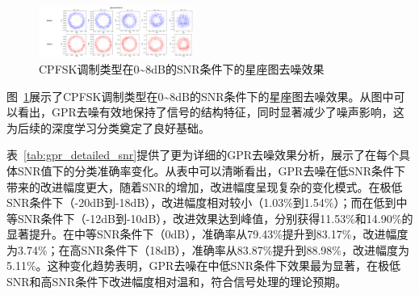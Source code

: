 \documentclass[conference]{IEEEtran}
\begin{document}
\begin{figure}[htbp]
\centering
\includegraphics[width=0.45\textwidth]{figure/constellation_denoising.png}
\caption{CPFSK调制类型在0\textasciitilde{}8dB的SNR条件下的星座图去噪效果}
\label{fig:constellation_denoising}
\end{figure}


图~\ref{fig:constellation_denoising}展示了CPFSK调制类型在0\textasciitilde{}8dB的SNR条件下的星座图去噪效果。从图中可以看出，GPR去噪有效地保持了信号的结构特征，同时显著减少了噪声影响，这为后续的深度学习分类奠定了良好基础。


表~\ref{tab:gpr_detailed_snr}提供了更为详细的GPR去噪效果分析，展示了在每个具体SNR值下的分类准确率变化。从表中可以清晰看出，GPR去噪在低SNR条件下带来的改进幅度更大，随着SNR的增加，改进幅度呈现复杂的变化模式。在极低SNR条件下（-20dB到-18dB），改进幅度相对较小（1.03\%到1.54\%）；而在低到中等SNR条件下（-12dB到-10dB），改进效果达到峰值，分别获得11.53\%和14.90\%的显著提升。在中等SNR条件下（0dB），准确率从79.43\%提升到83.17\%，改进幅度为3.74\%；在高SNR条件下（18dB），准确率从83.87\%提升到88.98\%，改进幅度为5.11\%。这种变化趋势表明，GPR去噪在中低SNR条件下效果最为显著，在极低SNR和高SNR条件下改进幅度相对温和，符合信号处理的理论预期。
\end{document}
